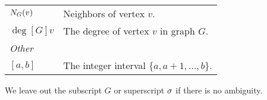 \begin{centering}
\begin{tabular}{l p{} l}
    $\N[G]{v}$ & \multicolumn{2}{l}{Neighbors of vertex $v$.}
    \vspace{\tablespace}\\

    $\deg[G]{v}$ & \multicolumn{2}{p{.815\textwidth}}{The degree of vertex $v$
      in graph $G$.} \vspace{\tablespace}\\

    \toprule
    \multicolumn{3}{l}{\emph{Other}} \\
    \midrule

    $[a,b]$ & \multicolumn{2}{l}{The integer interval $\{a, a+1, \dots, b\}$.}
    \vspace{2\tablespace}
  \end{tabular}
\end{centering}
\hidegame

We leave out the subscript $G$ or superscript $\sigma$ if there is no ambiguity.
